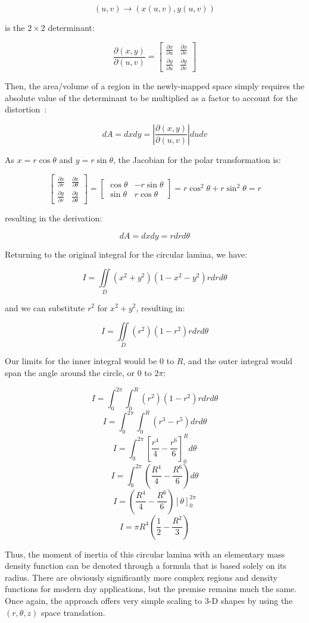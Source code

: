 \[(u, v) \rightarrow (x(u, v), y(u, v))\]

is the $2 \times 2$ determinant:

\[\frac{\partial(x,y)}{\partial(u,v)} = \begin{bmatrix} \frac{\partial x}{\partial u} & \frac{\partial x}{\partial v} \\ \frac{\partial y}{\partial u} & \frac{\partial y}{\partial v} \end{bmatrix}\]

Then, the area/volume of a region in the newly-mapped space simply requires the absolute value of the determinant to be multiplied as a factor to account for the distortion~\parencite{Weisstein_Jacobian}:

\[dA = dxdy = \left|\frac{\partial(x,y)}{\partial(u,v)}\right|dudv\]

As $x = r\cos \theta$ and $y = r\sin \theta$, the Jacobian for the polar transformation is:

\[ \begin{bmatrix} \frac{\partial x}{\partial r} & \frac{\partial x}{\partial \theta} \\ \frac{\partial y}{\partial r} & \frac{\partial y}{\partial \theta} \end{bmatrix} = \begin{bmatrix} \cos \theta & -r \sin \theta \\ \sin \theta & r \cos \theta \end{bmatrix} = r \cos^2{\theta} + r \sin^2{\theta} = r\]

resulting in the derivation:

\[dA = dxdy = rdrd\theta\]

Returning to the original integral for the circular lamina, we have:

\[I = \iint\limits_{D} (x^2+y^2)(1 - x^2 - y^2) rdrd\theta\]

and we can substitute $r^2$ for $x^2+y^2$, resulting in:

\[I = \iint\limits_{D} (r^2)(1 - r^2) rdrd\theta\]

Our limits for the inner integral would be $0$ to $R$, and the outer integral would span the angle around the circle, or $0$ to $2\pi$:

\[I = \int_0^{2\pi} \int_0^R (r^2)(1 - r^2) rdrd\theta\]
\[I = \int_0^{2\pi} \int_0^R (r^3 - r^5) drd\theta\]
\[I = \int_0^{2\pi} \left[\frac{r^4}{4} - \frac{r^6}{6}\right]_0^R d\theta\]
\[I = \int_0^{2\pi} \left(\frac{R^4}{4} - \frac{R^6}{6}\right) d\theta\]
\[I = \left(\frac{R^4}{4} - \frac{R^6}{6}\right)\left[\theta \right]_0^{2\pi}\]
\[I = \pi R^4\left(\frac{1}{2} - \frac{R^2}{3}\right)\]

Thus, the moment of inertia of this circular lamina with an elementary mass density function can be denoted through a formula that is based solely on its radius. There are obviously significantly more complex regions and density functions for modern day applications, but the premise remains much the same. Once again, the approach offers very simple scaling to 3-D shapes by using the $(r, \theta, z)$ space translation.